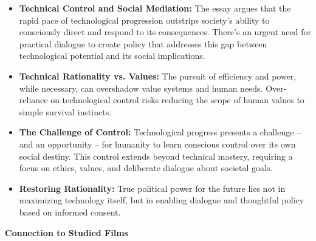 \documentclass[11pt,fleqn]{book} %
\begin{document}
\begin{itemize}
\item \textbf{Technical Control and Social Mediation:} The essay argues that the rapid pace of technological progression outstrips society's ability to consciously direct and respond to its consequences.  There's an urgent need for practical dialogue to create policy that addresses this gap between technological potential and its social implications. 

\item \textbf{Technical Rationality vs. Values:}  The pursuit of efficiency and power, while necessary, can overshadow value systems and human needs.  Over-reliance on technological control risks reducing the scope of human values to simple survival instincts. 

\item \textbf{The Challenge of Control:} Technological progress presents a challenge – and an opportunity – for  humanity to learn conscious control over its own social destiny. This control extends beyond technical mastery, requiring a focus on ethics, values, and deliberate dialogue about societal goals.

\item \textbf{Restoring Rationality:} True political power for the future lies not in maximizing technology itself, but in enabling dialogue and thoughtful policy based on informed consent.
\end{itemize}
\vspace{5pt}
\textbf{Connection to Studied Films}
\end{document}
